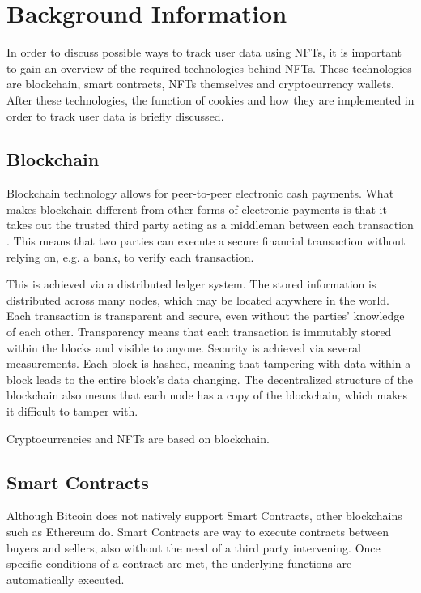 \chapter{Background Information}
\label{ch:background}
In order to discuss possible ways to track user data using NFTs, it is important to gain an overview of the required technologies behind NFTs. These technologies are blockchain, smart contracts, NFTs themselves and cryptocurrency wallets. After these technologies, the function of cookies and how they are implemented in order to track user data is briefly discussed.




%
%
\section{Blockchain}
\label{sec:background:blockchain}
Blockchain technology allows for peer-to-peer electronic cash payments. What makes blockchain different from other forms of electronic payments is that it takes out the trusted third party acting as a middleman between each transaction \cite{bitcoin}. This means that two parties can execute a secure financial transaction without relying on, e.g. a bank, to verify each transaction.

This is achieved via a distributed ledger system. The stored information is distributed across many nodes, which may be located anywhere in the world. Each transaction is transparent and secure, even without the parties' knowledge of each other. Transparency means that each transaction is immutably stored within the blocks and visible to anyone. Security is achieved via several measurements. Each block is hashed, meaning that tampering with data within a block leads to the entire block's data changing. The decentralized structure of the blockchain also means that each node has a copy of the blockchain, which makes it difficult to tamper with. \cite{blockchain}

Cryptocurrencies and NFTs are based on blockchain. 


%
%
\section{Smart Contracts}
\label{sec:background:smartcontracts}
Although Bitcoin does not natively support Smart Contracts, other blockchains such as Ethereum do. Smart Contracts are way to execute contracts between buyers and sellers, also without the need of a third party intervening. Once specific conditions of a contract are met, the underlying functions are automatically executed. \cite{smartContracts}

